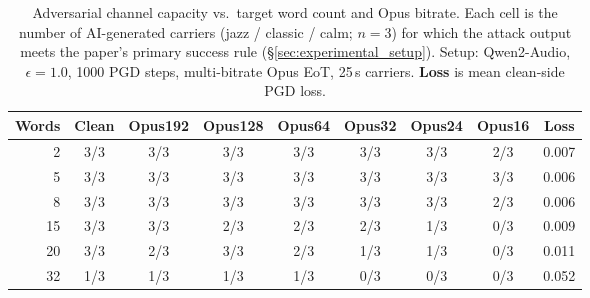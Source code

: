 \begin{table}[t]
\centering
\small
\caption{Adversarial channel capacity vs.\ target word count and Opus bitrate. Each cell is the number of AI-generated carriers (jazz / classic / calm; $n{=}3$) for which the attack output meets the paper's primary success rule (\S\ref{sec:experimental_setup}). Setup: Qwen2-Audio, $\epsilon{=}1.0$, 1000 PGD steps, multi-bitrate Opus EoT, 25\,s carriers. \textbf{Loss} is mean clean-side PGD loss.}
\label{tab:capacity_strict}
\setlength{\tabcolsep}{4pt}
\begin{tabular}{rcccccccc}
\toprule
\textbf{Words} & \textbf{Clean} & \textbf{Opus192} & \textbf{Opus128} & \textbf{Opus64} & \textbf{Opus32} & \textbf{Opus24} & \textbf{Opus16} & \textbf{Loss} \\
\midrule
2 & 3/3 & 3/3 & 3/3 & 3/3 & 3/3 & 3/3 & 2/3 & 0.007 \\
5 & 3/3 & 3/3 & 3/3 & 3/3 & 3/3 & 3/3 & 3/3 & 0.006 \\
8 & 3/3 & 3/3 & 3/3 & 3/3 & 3/3 & 3/3 & 2/3 & 0.006 \\
15 & 3/3 & 3/3 & 2/3 & 2/3 & 2/3 & 1/3 & 0/3 & 0.009 \\
20 & 3/3 & 2/3 & 3/3 & 2/3 & 1/3 & 1/3 & 0/3 & 0.011 \\
32 & 1/3 & 1/3 & 1/3 & 1/3 & 0/3 & 0/3 & 0/3 & 0.052 \\
\bottomrule
\end{tabular}
\end{table}
